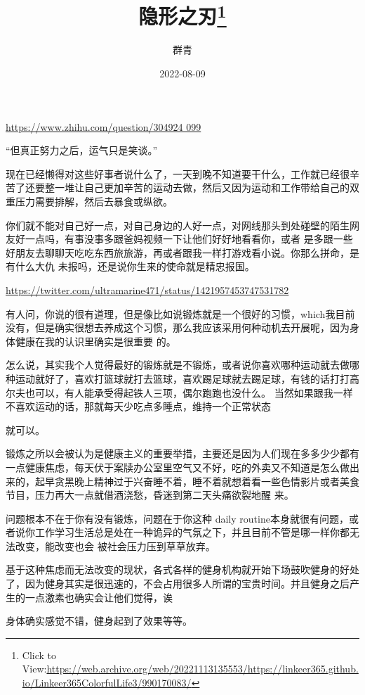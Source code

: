 \documentclass{article}
\title{隐形之刃\footnote{Click to View:\url{https://web.archive.org/web/20221113135553/https://linkeer365.github.io/Linkeer365ColorfulLife3/990170083/}}}
\author{群青}
\date{2022-08-09}
\begin{document}

\maketitle


\Large

﻿\url{https://www.zhihu.com/question/304924
099}  


“但真正努力之后，运气只是笑谈。”   

现在已经懒得对这些好事者说什么了，一天到晚不知道要干什么，工作就已经很辛苦了还要整一堆让自己更加辛苦的运动去做，然后又因为运动和工作带给自己的双重压力需要排解，然后去暴食或纵欲。
   

你们就不能对自己好一点，对自己身边的人好一点，对网线那头到处碰壁的陌生网友好一点吗，有事没事多跟爸妈视频一下让他们好好地看看你，或者
\newpage
是多跟一些好朋友去聊聊天吃吃东西旅旅游，再或者跟我一样打游戏看小说。你那么拼命，是有什么大仇
未报吗，还是说你生来的使命就是精忠报国。   

\url{https://twitter.com/ultramarine471/status/1421957453747531782
} 

有人问，你说的很有道理，但是像比如说锻炼就是一个很好的习惯，which我目前没有，但是确实很想去养成这个习惯，那么我应该采用何种动机去开展呢，因为身体健康在我的认识里确实是很重要
的。   

怎么说，其实我个人觉得最好的锻炼就是不锻炼，或者说你喜欢哪种运动就去做哪种运动就好了，喜欢打篮球就打去篮球，喜欢踢足球就去踢足球，有钱的话打打高尔夫也可以，有人能承受得起铁人三项，偶尔跑跑也没什么。 当然如果跟我一样不喜欢运动的话，那就每天少吃点多睡点，维持一个正常状态
\newpage

就可以。   

锻炼之所以会被认为是健康主义的重要举措，主要还是因为人们现在多多少少都有一点健康焦虑，每天伏于案牍办公室里空气又不好，吃的外卖又不知道是怎么做出来的，起早贪黑晚上精神过于兴奋睡不着，睡不着就想着看一些色情影片或者美食节目，压力再大一点就借酒浇愁，昏迷到第二天头痛欲裂地醒
来。   

问题根本不在于你有没有锻炼，问题在于你这种 daily routine本身就很有问题，或者说你工作学习生活总是处在一种诡异的气氛之下，并且目前不管是哪一样你都无法改变，能改变也会
被社会压力压到草草放弃。   

基于这种焦虑而无法改变的现状，各式各样的健身机构就开始下场鼓吹健身的好处了，因为健身其实是很迅速的，不会占用很多人所谓的宝贵时间。并且健身之后产生的一点激素也确实会让他们觉得，诶

\newpage
身体确实感觉不错，健身起到了效果等等。   
\end{document}
